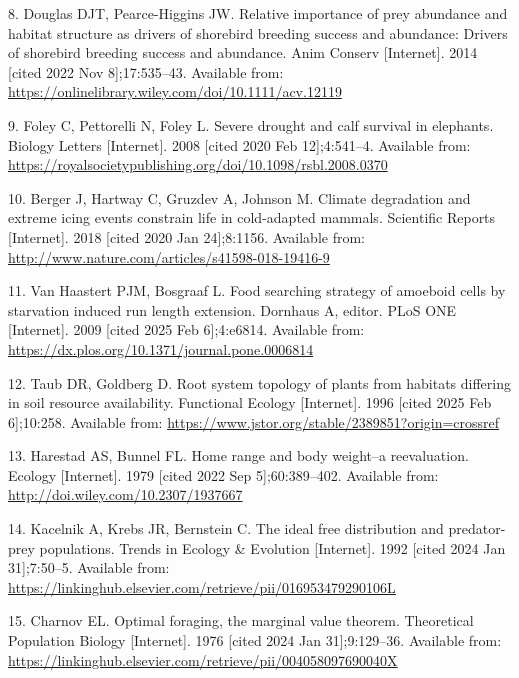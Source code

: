 \documentclass[
  12pt,
]{article}
\newlength{\cslhangindent}
\newenvironment{CSLReferences}[2] %
 {\begin{list}{}{%
  \setlength{\itemindent}{0pt}
  \setlength{\leftmargin}{0pt}
  \setlength{\parsep}{0pt}
  \ifodd #1
   \setlength{\leftmargin}{\cslhangindent}
   \setlength{\itemindent}{-1\cslhangindent}
  \fi
  \setlength{\itemsep}{#2\baselineskip}}}
 {\end{list}}
\begin{document}
\begin{CSLReferences}{0}{1}
8. Douglas DJT, Pearce-Higgins JW. Relative importance of prey abundance and habitat structure as drivers of shorebird breeding success and abundance: Drivers of shorebird breeding success and abundance. Anim Conserv {[}Internet{]}. 2014 {[}cited 2022 Nov 8{]};17:535--43. Available from: \url{https://onlinelibrary.wiley.com/doi/10.1111/acv.12119}

9. Foley C, Pettorelli N, Foley L. Severe drought and calf survival in elephants. Biology Letters {[}Internet{]}. 2008 {[}cited 2020 Feb 12{]};4:541--4. Available from: \url{https://royalsocietypublishing.org/doi/10.1098/rsbl.2008.0370}

10. Berger J, Hartway C, Gruzdev A, Johnson M. Climate degradation and extreme icing events constrain life in cold-adapted mammals. Scientific Reports {[}Internet{]}. 2018 {[}cited 2020 Jan 24{]};8:1156. Available from: \url{http://www.nature.com/articles/s41598-018-19416-9}

11. Van Haastert PJM, Bosgraaf L. Food searching strategy of amoeboid cells by starvation induced run length extension. Dornhaus A, editor. {PLoS} {ONE} {[}Internet{]}. 2009 {[}cited 2025 Feb 6{]};4:e6814. Available from: \url{https://dx.plos.org/10.1371/journal.pone.0006814}

12. Taub DR, Goldberg D. Root system topology of plants from habitats differing in soil resource availability. Functional Ecology {[}Internet{]}. 1996 {[}cited 2025 Feb 6{]};10:258. Available from: \url{https://www.jstor.org/stable/2389851?origin=crossref}

13. Harestad AS, Bunnel FL. Home range and body weight--a reevaluation. Ecology {[}Internet{]}. 1979 {[}cited 2022 Sep 5{]};60:389--402. Available from: \url{http://doi.wiley.com/10.2307/1937667}

14. Kacelnik A, Krebs JR, Bernstein C. The ideal free distribution and predator-prey populations. Trends in Ecology \& Evolution {[}Internet{]}. 1992 {[}cited 2024 Jan 31{]};7:50--5. Available from: \url{https://linkinghub.elsevier.com/retrieve/pii/016953479290106L}

15. Charnov EL. Optimal foraging, the marginal value theorem. Theoretical Population Biology {[}Internet{]}. 1976 {[}cited 2024 Jan 31{]};9:129--36. Available from: \url{https://linkinghub.elsevier.com/retrieve/pii/004058097690040X}


\end{CSLReferences}
\end{document}
